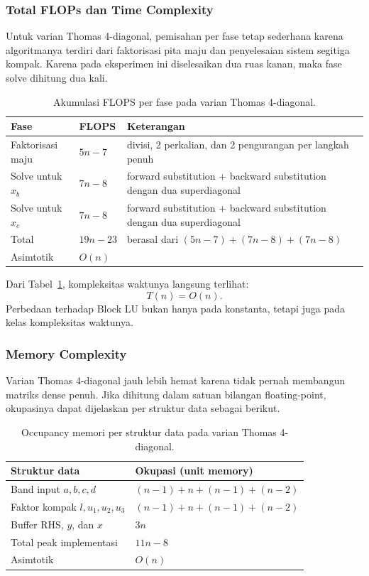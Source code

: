 \documentclass[12pt,a4paper]{article}
\begin{document}
\subsubsection*{Total FLOPs dan Time Complexity}
Untuk varian Thomas 4-diagonal, pemisahan per fase tetap sederhana karena algoritmanya terdiri dari faktorisasi pita maju dan penyelesaian sistem segitiga kompak. Karena pada eksperimen ini diselesaikan dua ruas kanan, maka fase solve dihitung dua kali.

\begin{table}[h]
\centering
\caption{Akumulasi FLOPS per fase pada varian Thomas 4-diagonal.}
\label{tab:thomas-flops}
\small
\begin{tabularx}{\textwidth}{>{\raggedright\arraybackslash}p{} >{\centering\arraybackslash}p{} >{\raggedright\arraybackslash}X}
\toprule
Fase & FLOPS & Keterangan \\
\midrule
Faktorisasi maju & $5n - 7$ & 1 divisi, 2 perkalian, dan 2 pengurangan per langkah penuh \\
Solve untuk $x_b$ & $7n - 8$ & forward substitution + backward substitution dengan dua superdiagonal \\
Solve untuk $x_c$ & $7n - 8$ & forward substitution + backward substitution dengan dua superdiagonal \\
\midrule
Total & $19n - 23$ & berasal dari $(5n-7) + (7n-8) + (7n-8)$ \\
Asimtotik & $O(n)$ & \\
\bottomrule
\end{tabularx}
\normalsize
\end{table}

Dari Tabel~\ref{tab:thomas-flops}, kompleksitas waktunya langsung terlihat:
\[
T(n)=O(n).
\]
Perbedaan terhadap Block LU bukan hanya pada konstanta, tetapi juga pada kelas kompleksitas waktunya.

\subsubsection*{Memory Complexity}
Varian Thomas 4-diagonal jauh lebih hemat karena tidak pernah membangun matriks dense penuh. Jika dihitung dalam satuan bilangan floating-point, okupasinya dapat dijelaskan per struktur data sebagai berikut.

\begin{table}[h]
\centering
\caption{Occupancy memori per struktur data pada varian Thomas 4-diagonal.}
\label{tab:thomas-memory}
\begin{tabular}{ll}
\toprule
Struktur data & Okupasi (unit memory) \\
\midrule
Band input $a,b,c,d$ & $(n-1) + n + (n-1) + (n-2)$ \\
Faktor kompak $l,u_1,u_2,u_3$ & $(n-1) + n + (n-1) + (n-2)$ \\
Buffer RHS, $y$, dan $x$ & $3n$ \\
\midrule
Total peak implementasi & $11n - 8$ \\
Asimtotik & $O(n)$ \\
\bottomrule
\end{tabular}
\end{table}
\end{document}
